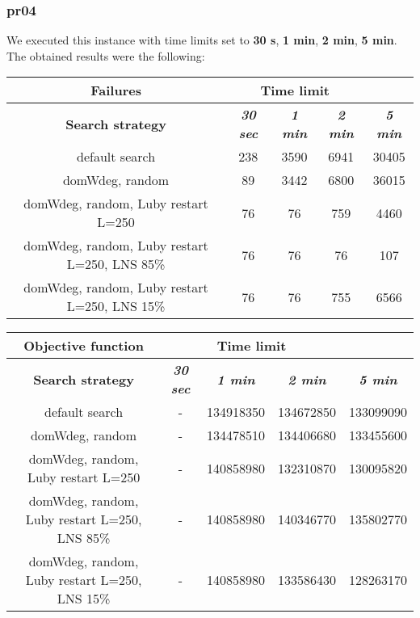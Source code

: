\subsubsection{pr04}
We executed this instance with time limits set to \textbf{30 s}, \textbf{1 min}, \textbf{2 min}, \textbf{5 min}.\\
The obtained results were the following:
{
\renewcommand{\arraystretch}{2}
\begin{longtable}[h]{| c | c | c | c | c |}
    \hline
    \textbf{Failures} & \multicolumn{3}{c}{Time limit} & \\
    \hline
    \textbf{Search strategy} & \textbf{\textit{30 sec}} & \textbf{\textit{1 min}} & \textbf{\textit{2 min}} & \textbf{\textit{5 min}} \\
    \hline
    \endhead
    default search                                & 238 &  3590 &  6941 &  30405 \\
    \hline
    domWdeg, random                               &  89 &  3442 &  6800 &  36015 \\
    \hline
    domWdeg, random, Luby restart L=250           &  76 &    76 &   759 &   4460 \\
    \hline
    domWdeg, random, Luby restart L=250, LNS 85\% &  76 &    76 &    76 &    107 \\
    \hline
    domWdeg, random, Luby restart L=250, LNS 15\% &  76 &    76 &   755 &   6566 \\
    \hline
\end{longtable}
}

{
\renewcommand{\arraystretch}{2}
\begin{longtable}[h]{| c | c | c | c | c |}
    \hline
    \textbf{Objective function} & \multicolumn{3}{c}{Time limit} & \\
    \hline
    \textbf{Search strategy} & \textbf{\textit{30 sec}} & \textbf{\textit{1 min}} & \textbf{\textit{2 min}} & \textbf{\textit{5 min}} \\
    \hline
    \endhead
    default search                                &         - & 134918350 & 134672850 & 133099090 \\
    \hline
    domWdeg, random                               &         - & 134478510 & 134406680 & 133455600 \\
    \hline
    domWdeg, random, Luby restart L=250           &         - & 140858980 & 132310870 & 130095820 \\
    \hline
    domWdeg, random, Luby restart L=250, LNS 85\% &         - & 140858980 & 140346770 & 135802770 \\
    \hline
    domWdeg, random, Luby restart L=250, LNS 15\% &         - & 140858980 & 133586430 & 128263170 \\
    \hline
\end{longtable}
}